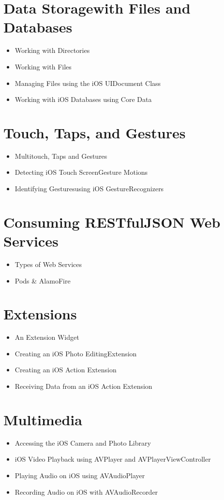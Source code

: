 \documentclass[14pt]{extarticle}
\begin{document}
\section{Data Storagewith Files and Databases}
\begin{itemize}
	\item Working with Directories
	\item Working with Files
	\item Managing Files using the iOS UIDocument Class
	\item Working with iOS Databases using Core Data
\end{itemize}

\section{Touch, Taps, and Gestures}
\begin{itemize}
	\item Multitouch, Taps and Gestures
	\item Detecting iOS Touch ScreenGesture Motions
	\item Identifying Gesturesusing iOS	GestureRecognizers
\end{itemize}

\section{Consuming RESTfulJSON Web Services}
\begin{itemize}
	\item Types of Web Services
	\item Pods \& AlamoFire
\end{itemize}

\section{Extensions}
\begin{itemize}
	\item An Extension Widget
	\item Creating an iOS Photo EditingExtension
	\item Creating an iOS Action Extension
	\item Receiving Data from an iOS Action Extension
\end{itemize}

\section{Multimedia}
\begin{itemize}
	\item Accessing the iOS Camera and Photo Library
	\item iOS Video Playback using AVPlayer and
	AVPlayerViewController
	\item Playing Audio on iOS using AVAudioPlayer
	\item Recording Audio on iOS with AVAudioRecorder
\end{itemize}
\end{document}
